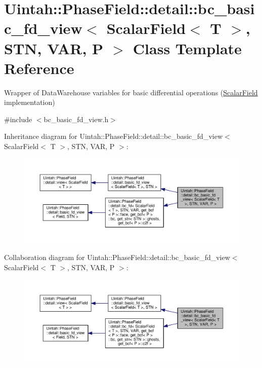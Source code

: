 \hypertarget{classUintah_1_1PhaseField_1_1detail_1_1bc__basic__fd__view_3_01ScalarField_3_01T_01_4_00_01STN_00_01VAR_00_01P_01_4}{}\section{Uintah\+:\+:Phase\+Field\+:\+:detail\+:\+:bc\+\_\+basic\+\_\+fd\+\_\+view$<$ Scalar\+Field$<$ T $>$, S\+TN, V\+AR, P $>$ Class Template Reference}
\label{classUintah_1_1PhaseField_1_1detail_1_1bc__basic__fd__view_3_01ScalarField_3_01T_01_4_00_01STN_00_01VAR_00_01P_01_4}


Wrapper of Data\+Warehouse variables for basic differential operations (\hyperlink{structUintah_1_1PhaseField_1_1ScalarField}{Scalar\+Field} implementation)  




{\ttfamily \#include $<$bc\+\_\+basic\+\_\+fd\+\_\+view.\+h$>$}



Inheritance diagram for Uintah\+:\+:Phase\+Field\+:\+:detail\+:\+:bc\+\_\+basic\+\_\+fd\+\_\+view$<$ Scalar\+Field$<$ T $>$, S\+TN, V\+AR, P $>$\+:\nopagebreak
\begin{figure}[H]
\begin{center}
\leavevmode
\includegraphics[width=350pt]{classUintah_1_1PhaseField_1_1detail_1_1bc__basic__fd__view_3_01ScalarField_3_01T_01_4_00_01STN_02b3cc3e1866aa450fde42bf2262388e3}
\end{center}
\end{figure}


Collaboration diagram for Uintah\+:\+:Phase\+Field\+:\+:detail\+:\+:bc\+\_\+basic\+\_\+fd\+\_\+view$<$ Scalar\+Field$<$ T $>$, S\+TN, V\+AR, P $>$\+:\nopagebreak
\begin{figure}[H]
\begin{center}
\leavevmode
\includegraphics[width=350pt]{classUintah_1_1PhaseField_1_1detail_1_1bc__basic__fd__view_3_01ScalarField_3_01T_01_4_00_01STN_0cbac9e814a2ccab639c7edbd28b0fdcb}
\end{center}
\end{figure}
